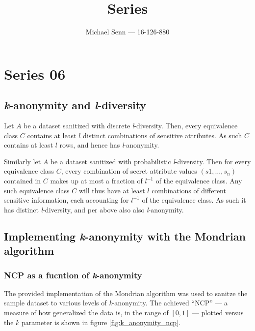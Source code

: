 \documentclass[a4paper]{scrreprt}
\title{Series \series}
\author{Michael Senn \maillink{michael.senn@students.unibe.ch} --- 16-126-880}
\date{\printdate}
\newcommand{\series}{06}
\begin{document}
\maketitle


\setcounter{chapter}{\numexpr \series - 1 \relax}

\chapter{Series \series}

\section{\emph{k}-anonymity and \emph{l}-diversity}

Let $A$ be a dataset sanitized with discrete \emph{l}-diversity. Then, every
equivalence class $C$ contains at least $l$ distinct combinations of sensitive
attributes. As such $C$ contains at least $l$ rows, and hence has
\emph{l}-anonymity.

Similarly let $A$ be a dataset sanitized with probabilistic \emph{l}-diversity.
Then for every equivalence class $C$, every combination of secret attribute
values $(s1, \ldots, s_n)$ contained in $C$ makes up at most a fraction of
$l^{-1}$ of the equivalence class. Any such equivalence class $C$ will thus
have at least $l$ combinations of different sensitive information, each
accounting for $l^{-1}$ of the equivalence class. As such it has distinct
\emph{l}-diversity, and per above also also \emph{l}-anonymity.

\section{Implementing \emph{k}-anonymity with the Mondrian algorithm}

\subsection{NCP as a fucntion of \emph{k}-anonymity}

The provided implementation of the Mondrian algorithm was used to sanitze the
sample dataset to various levels of \emph{k}-anonymity. The achieved ``NCP''
--- a measure of how generalized the data is, in the range of $[0, 1]$  ---
plotted versus the $k$ parameter is shown in figure \ref{fig:k_anonymity_ncp}.
\end{document}
